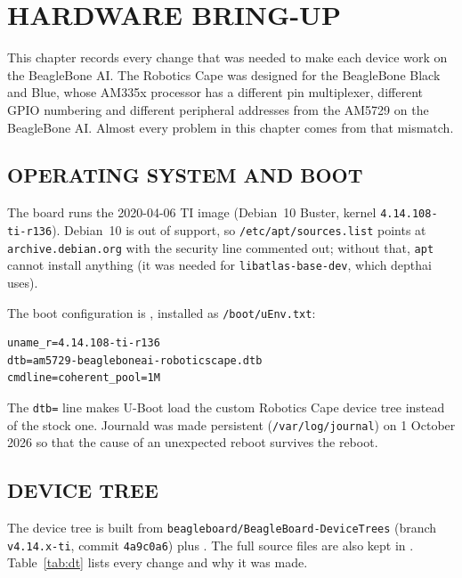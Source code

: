 \chapter{HARDWARE BRING-UP}
\label{ch:hardware}

This chapter records every change that was needed to make each device work on
the BeagleBone AI. The Robotics Cape was designed for the BeagleBone Black and
Blue, whose AM335x processor has a different pin multiplexer, different GPIO
numbering and different peripheral addresses from the AM5729 on the
BeagleBone AI. Almost every problem in this chapter comes from that mismatch.

\section{OPERATING SYSTEM AND BOOT}

The board runs the 2020-04-06 TI image (Debian~10 Buster, kernel
\texttt{4.14.108-ti-r136}). Debian~10 is out of support, so
\texttt{/etc/apt/sources.list} points at \texttt{archive.debian.org} with the
security line commented out; without that, \texttt{apt} cannot install
anything (it was needed for \texttt{libatlas-base-dev}, which depthai uses).

The boot configuration is , installed as
\texttt{/boot/uEnv.txt}:
\begin{lstlisting}
uname_r=4.14.108-ti-r136
dtb=am5729-beagleboneai-roboticscape.dtb
cmdline=coherent_pool=1M
\end{lstlisting}
The \texttt{dtb=} line makes U-Boot load the custom Robotics Cape device tree
instead of the stock one. Journald was made persistent
(\texttt{/var/log/journal}) on 1 October 2026 so that the cause of an
unexpected reboot survives the reboot.

\section{DEVICE TREE}
\label{sec:dt}

The device tree is built from \texttt{beagleboard/BeagleBoard-DeviceTrees}
(branch \texttt{v4.14.x-ti}, commit \texttt{4a9c0a6}) plus
. The full source files are also
kept in . Table~\ref{tab:dt} lists every change and why it
was made.

